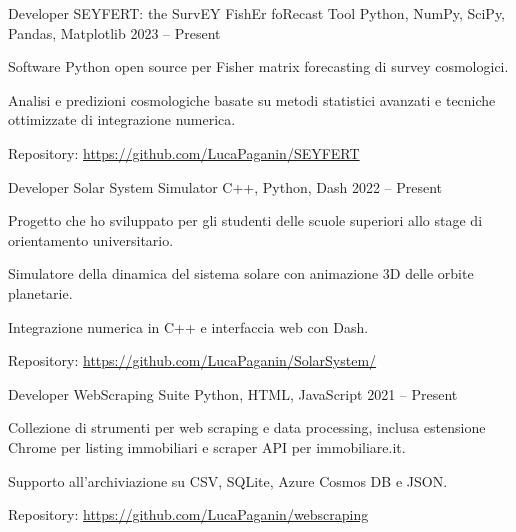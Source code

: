 


\begin{cventries}


\cventry
{Developer} %
{SEYFERT: the SurvEY FishEr foRecast Tool} %
{Python, NumPy, SciPy, Pandas, Matplotlib} %
{2023 -- Present} %
{ %
\begin{cvitems}
  \item {Software Python open source per Fisher matrix forecasting di survey cosmologici.}
  \item {Analisi e predizioni cosmologiche basate su metodi statistici avanzati e tecniche ottimizzate di integrazione numerica.}
  \item {Repository: \url{https://github.com/LucaPaganin/SEYFERT}}
\end{cvitems}
}


\cventry
{Developer} %
{Solar System Simulator} %
{C++, Python, Dash} %
{2022 -- Present} %
{ %
\begin{cvitems}
    \item {Progetto che ho sviluppato per gli studenti delle scuole superiori allo stage di orientamento universitario.}
    \item {Simulatore della dinamica del sistema solare con animazione 3D delle orbite planetarie.}
    \item {Integrazione numerica in C++ e interfaccia web con Dash.}
    \item {Repository: \url{https://github.com/LucaPaganin/SolarSystem/}}  
\end{cvitems}
}


\cventry
{Developer} %
{WebScraping Suite} %
{Python, HTML, JavaScript} %
{2021 -- Present} %
{ %
\begin{cvitems}
  \item {Collezione di strumenti per web scraping e data processing, inclusa estensione Chrome per listing immobiliari e scraper API per immobiliare.it.}
  \item {Supporto all'archiviazione su CSV, SQLite, Azure Cosmos DB e JSON.}
  \item {Repository: \url{https://github.com/LucaPaganin/webscraping}}  
\end{cvitems}
}


\end{cventries}
